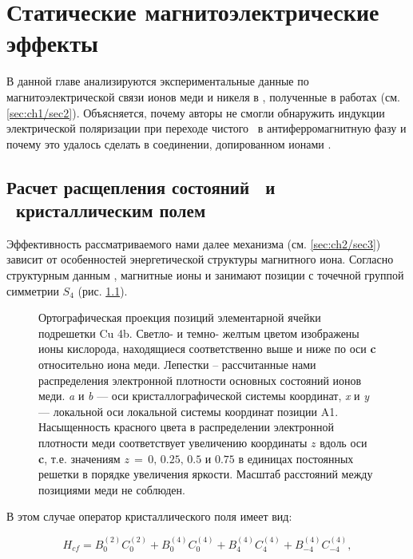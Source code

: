 \chapter{Статические магнитоэлектрические эффекты}\label{ch:ch2}

В данной главе анализируются экспериментальные данные по магнитоэлектрической связи ионов меди и никеля в \ncbo, полученные в работах \cite{Nenert2007, Khanh2013} (см. \cref{sec:ch1/sec2}). Объясняется, почему авторы \cite{Nenert2007} не смогли обнаружить индукции электрической поляризации при переходе чистого \cbo\ в антиферромагнитную фазу и почему это удалось сделать в соединении, допированном ионами \niIon.

\section{Расчет расщепления состояний \cud\ и \nif\ кристаллическим полем}\label{sec:ch2/sec1}

Эффективность рассматриваемого нами далее механизма (см. \cref{sec:ch2/sec3}) зависит от особенностей энергетической структуры магнитного иона. Согласно структурным данным \cite{Martinez1971}, магнитные ионы \niIon и \cu занимают позиции с точечной группой симметрии \(S_4\) (рис. \cref{fig:cu_distributions}).

\begin{figure}[ht]
    \caption{Ортографическая проекция позиций элементарной ячейки подрешетки Cu 4b. Светло- и темно- желтым цветом изображены ионы кислорода, находящиеся соответственно выше и ниже по оси \textbf{c} относительно иона меди. Лепестки – рассчитанные нами распределения электронной плотности основных состояний ионов меди. \textit{a} и \textit{b} --- оси кристаллографической системы координат, \textit{x} и \textit{y} --- локальной оси локальной системы координат позиции A1. Насыщенность красного цвета в распределении электронной плотности меди соответствует увеличению координаты $z$ вдоль оси \textbf{c}, т.е. значениям $z\,{=}\,0,\,0.25,\,0.5 \text{ и } 0.75$ в единицах постоянных решетки в порядке увеличения яркости. Масштаб расстояний между позициями меди не соблюден.}
    \label{fig:cu_distributions}
\end{figure}

В этом случае оператор кристаллического поля имеет вид:

\begin{equation}
	\label{eq:Hcf}
	H_{cf}=B_{0}^{(2)}C_{0}^{(2)}+B_{0}^{(4)}C_{0}^{(4)}+B_{4}^{(4)}C_{4}^{(4)}+B_{-4}^{(4)}C_{-4}^{(4)},
\end{equation}

